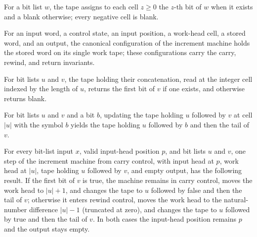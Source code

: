 \begin{definition}
\label{Complexity.clCountTape}
\leanok
For a bit list $w$, the tape assigns to each cell $z \ge 0$ the $z$-th bit of $w$ when it exists and a blank otherwise; every negative cell is blank.
\end{definition}

\begin{definition}
\label{Complexity.clCountCfg}
\leanok
{}
For an input word, a control state, an input position, a work-head cell, a stored word, and an output, the canonical configuration of the increment machine holds the stored word on its single work tape; these configurations carry the carry, rewind, and return invariants.
\end{definition}

\begin{lemma}
\label{Complexity.clCountTape_read}
\leanok
{}
For bit lists $u$ and $v$, the tape holding their concatenation, read at the integer
cell indexed by the length of $u$, returns the first bit of $v$ if one exists, and
otherwise returns blank.
\end{lemma}

\begin{lemma}
\label{Complexity.clCountTape_write}
\leanok
{}
For bit lists $u$ and $v$ and a bit $b$, updating the tape holding $u$ followed by $v$
at cell $|u|$ with the symbol $b$ yields the tape holding $u$ followed by $b$ and then
the tail of $v$.
\end{lemma}

\begin{lemma}
\label{Complexity.clCount_carry_step}
\leanok
{}
For every bit-list input $x$, valid input-head position $p$, and bit lists $u$ and $v$,
one step of the increment machine from carry control, with input head at $p$, work head
at $|u|$, tape holding $u$ followed by $v$, and empty output, has the following result.
If the first bit of $v$ is true, the machine remains in carry control, moves the work
head to $|u|+1$, and changes the tape to $u$ followed by false and then the tail of $v$;
otherwise it enters rewind control, moves the work head to the natural-number difference
$|u|-1$ (truncated at zero), and changes the tape to $u$ followed by true and then the
tail of $v$. In both cases the input-head position remains $p$ and the output stays
empty.
\end{lemma}

